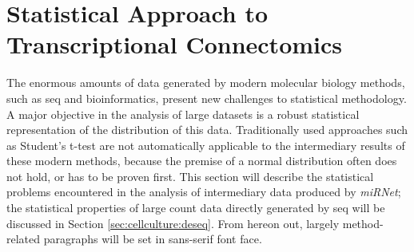 
\section{Statistical Approach to Transcriptional Connectomics}
The enormous amounts of data generated by modern molecular biology methods, such as \ac{seq} and bioinformatics, present new challenges to statistical methodology. A major objective in the analysis of large datasets is a robust statistical representation of the distribution of this data. Traditionally used approaches such as Student's t-test are not automatically applicable to the intermediary results of these modern methods, because the premise of a normal distribution often does not hold, or has to be proven first. This section will describe the statistical problems encountered in the analysis of intermediary data produced by \textit{miRNet}; the statistical properties of large count data directly generated by \ac{seq} will be discussed in Section \ref{sec:cellculture:deseq}. From hereon out, largely method-related paragraphs will be set in sans-serif font face.

